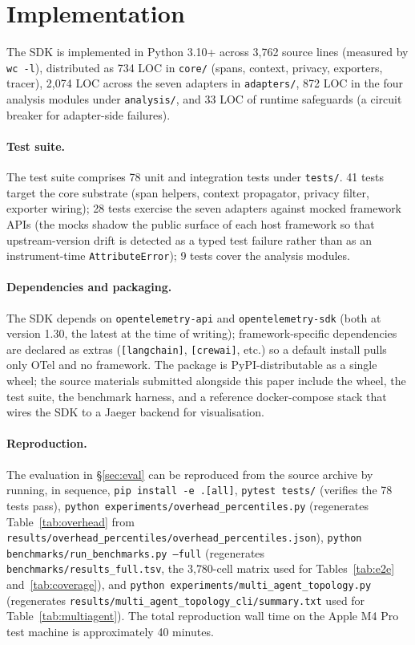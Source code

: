 \documentclass[sigconf,review,anonymous,9pt]{acmart}
\begin{document}
\section{Implementation}
\label{sec:impl}

The SDK is implemented in Python 3.10+ across 3{,}762 source lines
(measured by \texttt{wc -l}), distributed as 734 LOC in
\texttt{core/} (spans, context, privacy, exporters, tracer), 2{,}074
LOC across the seven adapters in \texttt{adapters/}, 872 LOC in the
four analysis modules under \texttt{analysis/}, and 33 LOC of
runtime safeguards (a circuit breaker for adapter-side failures).

\paragraph{Test suite.}
The test suite comprises 78 unit and integration tests under
\texttt{tests/}. 41 tests target the core substrate (span helpers,
context propagator, privacy filter, exporter wiring); 28 tests
exercise the seven adapters against mocked framework APIs (the mocks
shadow the public surface of each host framework so that
upstream-version drift is detected as a typed test failure rather
than as an instrument-time \texttt{AttributeError}); 9 tests cover
the analysis modules.

\paragraph{Dependencies and packaging.}
The SDK depends on \texttt{opentelemetry-api} and
\texttt{opentelemetry-sdk} (both at version 1.30, the latest at the
time of writing); framework-specific dependencies are declared as
extras (\texttt{[langchain]}, \texttt{[crewai]}, etc.) so a default
install pulls only OTel and no framework. The package is
PyPI-distributable as a single wheel; the source materials submitted
alongside this paper include the wheel, the test suite, the
benchmark harness, and a reference docker-compose stack that wires
the SDK to a Jaeger backend for visualisation.

\paragraph{Reproduction.}
The evaluation in \S\ref{sec:eval} can be reproduced from the source
archive by running, in sequence, \texttt{pip install -e .[all]},
\texttt{pytest tests/} (verifies the 78 tests pass),
\texttt{python experiments/overhead\_percentiles.py} (regenerates
Table~\ref{tab:overhead} from
\texttt{results/overhead\_percentiles/overhead\_percentiles.json}),
\texttt{python benchmarks/run\_benchmarks.py --full} (regenerates
\texttt{benchmarks/results\_full.tsv}, the 3{,}780-cell matrix used
for Tables~\ref{tab:e2e} and~\ref{tab:coverage}), and
\texttt{python experiments/multi\_agent\_topology.py} (regenerates
\texttt{results/multi\_agent\_topology\_cli/summary.txt} used for
Table~\ref{tab:multiagent}). The total reproduction wall time on the
Apple M4 Pro test machine is approximately 40 minutes.
\end{document}
